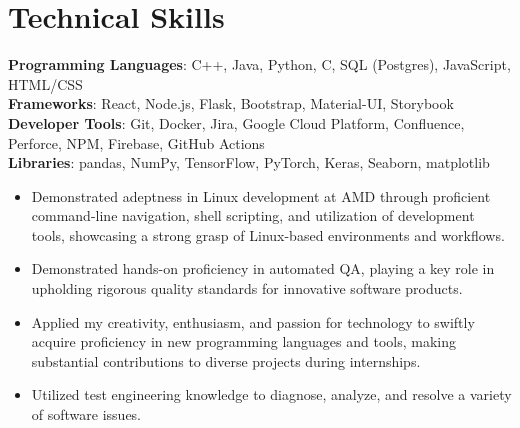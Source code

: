 \documentclass[letterpaper,11pt]{article}
\newcommand{\resumeItem}[1]{
  \item\small{
    {#1 \vspace{-2pt}}
  }
}
\newcommand{\resumeItemListStart}{\begin{itemize}}
\newcommand{\resumeItemListEnd}{\end{itemize}\vspace{-5pt}}
\begin{document}
\section{Technical Skills}
 \begin{itemize}[leftmargin=0.15in, label={}]
    \small{\item{
     \textbf{Programming Languages}{: C++, Java, Python, C, SQL (Postgres), JavaScript, HTML/CSS} \\
     \textbf{Frameworks}{: React, Node.js, Flask, Bootstrap, Material-UI, Storybook } \\
     \textbf{Developer Tools}{: Git, Docker, Jira, Google Cloud Platform, Confluence, Perforce, NPM, Firebase, GitHub Actions } \\
     \textbf{Libraries}{: pandas, NumPy, TensorFlow, PyTorch, Keras, Seaborn, matplotlib } \\
     \resumeItemListStart
            \resumeItem{Demonstrated adeptness in Linux development at AMD through proficient command-line navigation, shell scripting, and utilization of development tools, showcasing a strong grasp of Linux-based environments and workflows.}
            \resumeItem{Demonstrated hands-on proficiency in automated QA, playing a key role in upholding rigorous quality standards for innovative software products.}
            \resumeItem{Applied my creativity, enthusiasm, and passion for technology to swiftly acquire proficiency in new programming languages and tools, making substantial contributions to diverse projects during internships.}
            \resumeItem{Utilized test engineering knowledge to diagnose, analyze, and resolve a variety of software issues.}
    \resumeItemListEnd
    }}
 \end{itemize}


\end{document}
